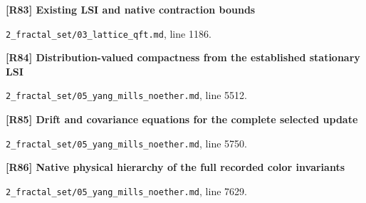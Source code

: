 \documentclass[11pt,a4paper]{article}
\begin{document}
\par\medskip\noindent\begin{minipage}{\linewidth}\textbf{[R83] Existing LSI and native contraction bounds}\label{src:cor-lqft-fock-lsi-transfer}\par
{\small\texttt{}\par
\nolinkurl{2_fractal_set/03_lattice_qft.md}, line 1186.\par}
\end{minipage}\par

\par\medskip\noindent\begin{minipage}{\linewidth}\textbf{[R84] Distribution-valued compactness from the established stationary LSI}\label{src:thm-ym-spacetime-fluctuation-compactness}\par
{\small\texttt{}\par
\nolinkurl{2_fractal_set/05_yang_mills_noether.md}, line 5512.\par}
\end{minipage}\par

\par\medskip\noindent\begin{minipage}{\linewidth}\textbf{[R85] Drift and covariance equations for the complete selected update}\label{src:prop-ym-complete-fluctuation-equations}\par
{\small\texttt{}\par
\nolinkurl{2_fractal_set/05_yang_mills_noether.md}, line 5750.\par}
\end{minipage}\par

\par\medskip\noindent\begin{minipage}{\linewidth}\textbf{[R86] Native physical hierarchy of the full recorded color invariants}\label{src:thm-ym-native-physical-gauge-hierarchy}\par
{\small\texttt{}\par
\nolinkurl{2_fractal_set/05_yang_mills_noether.md}, line 7629.\par}
\end{minipage}\par
\end{document}
